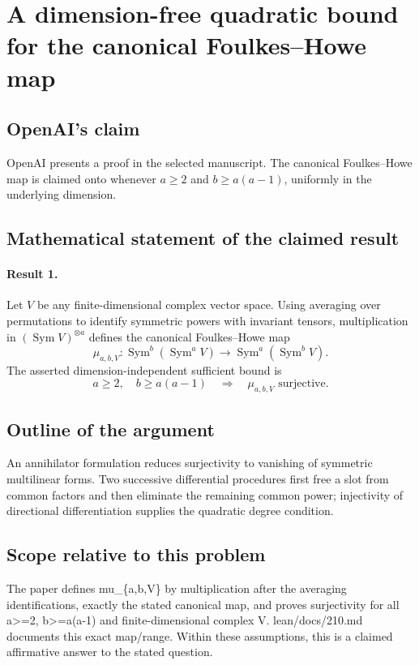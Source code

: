 \documentclass[11pt]{article}
\begin{document}
\section*{A dimension-free quadratic bound for the canonical Foulkes–Howe map}

\subsection{OpenAI's claim}
OpenAI presents a proof in the selected manuscript. The canonical Foulkes--Howe map is claimed onto whenever $a\geq2$ and $b\geq a(a-1)$, uniformly in the underlying dimension.

\subsection{Mathematical statement of the claimed result}
\paragraph{Result 1.} Let \(V\) be any finite-dimensional complex vector space. Using averaging over permutations to identify symmetric powers with invariant tensors, multiplication in \((\operatorname{Sym}V)^{\otimes a}\) defines the canonical Foulkes--Howe map
\[
 \mu_{a,b,V}:\operatorname{Sym}^b(\operatorname{Sym}^aV)
 \longrightarrow\operatorname{Sym}^a(\operatorname{Sym}^bV).
\]
The asserted dimension-independent sufficient bound is
\[
 a\ge2,\quad b\ge a(a-1)\quad\Longrightarrow\quad\mu_{a,b,V}\text{ surjective}.
\]

\subsection{Outline of the argument}
An annihilator formulation reduces surjectivity to vanishing of symmetric multilinear forms. Two successive differential procedures first free a slot from common factors and then eliminate the remaining common power; injectivity of directional differentiation supplies the quadratic degree condition.

\subsection{Scope relative to this problem}
The paper defines mu\_\{a,b,V\} by multiplication after the averaging identifications, exactly the stated canonical map, and proves surjectivity for all a>=2, b>=a(a-1) and finite-dimensional complex V. lean/docs/210.md documents this exact map/range. Within these assumptions, this is a claimed affirmative answer to the stated question.
\end{document}
